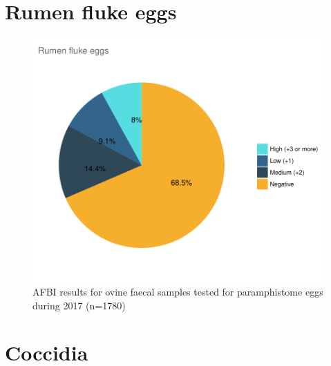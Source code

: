 \documentclass[]{book}
\begin{document}
\section{Rumen fluke eggs}\label{rumen-fluke-eggs-1}

\begin{figure}

{\centering \includegraphics{AFBI_files/figure-latex/unnamed-chunk-119-1} 

}

\caption{AFBI results for ovine faecal samples tested for paramphistome eggs during 2017 (n=1780)}\label{fig:unnamed-chunk-119}
\end{figure}

\section{Coccidia}\label{coccidia-1}
\end{document}
